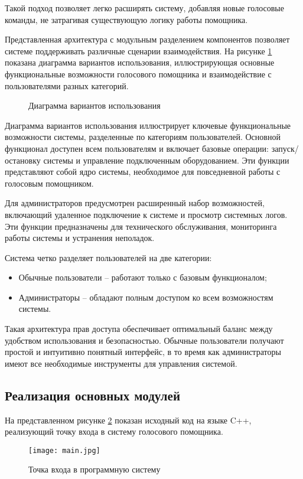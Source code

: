 Такой подход позволяет легко расширять систему, добавляя новые голосовые команды, не затрагивая существующую логику работы помощника.

Представленная архитектура с модульным разделением компонентов позволяет системе поддерживать различные сценарии взаимодействия. На рисунке \ref{fig:use_case_diagram} показана диаграмма вариантов использования, иллюстрирующая основные функциональные возможности голосового помощника и взаимодействие с пользователями разных категорий.

\begin{figure}[H]
	\centering
	\caption{Диаграмма вариантов использования}
	\label{fig:use_case_diagram}
\end{figure}

Диаграмма вариантов использования иллюстрирует ключевые функциональные возможности системы, разделенные по категориям пользователей. Основной функционал доступен всем пользователям и включает базовые операции: запуск/остановку системы и управление подключенным оборудованием. Эти функции представляют собой ядро системы, необходимое для повседневной работы с голосовым помощником.

Для администраторов предусмотрен расширенный набор возможностей, включающий удаленное подключение к системе и просмотр системных логов. Эти функции предназначены для технического обслуживания, мониторинга работы системы и устранения неполадок.

Система четко разделяет пользователей на две категории:
\begin{itemize}
	\item Обычные пользователи -- работают только с базовым функционалом;
	\item Администраторы -- обладают полным доступом ко всем возможностям системы.
\end{itemize}

Такая архитектура прав доступа обеспечивает оптимальный баланс между удобством использования и безопасностью. Обычные пользователи получают простой и интуитивно понятный интерфейс, в то время как администраторы имеют все необходимые инструменты для управления системой.

\subsection{Реализация основных модулей}

На представленном рисунке \ref{fig:main.cpp} показан исходный код на языке C++, реализующий точку входа в систему голосового помощника.
\begin{figure}[H]
	\centering
	\texttt{[image: main.jpg]}
	\caption{Точка входа в программную систему}
	\label{fig:main.cpp}
\end{figure}

